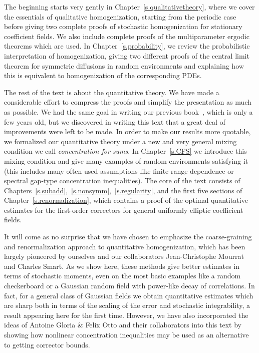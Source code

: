 \documentclass[11pt,twoside]{article} %
\numberwithin{equation}{section}
\theoremstyle{definition}
\begin{document}
 \smallskip
 
The beginning starts very gently in Chapter~\ref{s.qualitativetheory}, where we cover the essentials of qualitative homogenization, starting from the periodic case before giving two complete proofs of stochastic homogenization for stationary coefficient fields. We also include complete proofs of the multiparameter ergodic theorems which are used. 
In Chapter~\ref{s.probability}, we review the probabilistic interpretation of homogenization, giving two different proofs of the central limit theorem for symmetric diffusions in random environments and explaining how this is equivalent to homogenization of the corresponding PDEs. 

\smallskip

The rest of the text is about the quantitative theory. We have made a considerable effort to compress the proofs and simplify the presentation as much as possible. We had the same goal in writing our previous book~\cite{AKMBook}, which is only a few years old, but we discovered in writing this text that a great deal of improvements were left to be made. 
In order to make our results more quotable, we formalized our quantitative theory under a new and very general mixing condition we call \emph{concentration for sums}. In Chapter~\ref{s.CFS} we introduce this mixing condition and give many examples of random environments satisfying it (this includes many often-used assumptions like finite range dependence or spectral gap-type concentration inequalities). 
The core of the text consists of Chapters~\ref{s.subadd},~\ref{s.nonsymm},~\ref{s.regularity}, and the first five sections of Chapter~\ref{s.renormalization}, which contains a proof of the optimal quantitative estimates for the first-order correctors for general uniformly elliptic coefficient fields. 

\smallskip

It will come as no surprise that we have chosen to emphasize the coarse-graining and renormalization approach to quantitative homogenization, which has been largely pioneered by ourselves and our collaborators Jean-Christophe Mourrat and Charles Smart. As we show here, these methods give better estimates in terms of stochastic moments, even on the most basic examples like a random checkerboard or a Gaussian random field with power-like decay of correlations. In fact, for a general class of Gaussian fields we obtain quantitative estimates which are sharp both in terms of the scaling of the error and stochastic integrability, a result appearing here for the first time. However, we have also incorporated the ideas of Antoine Gloria \& Felix Otto and their collaborators into this text by showing how nonlinear concentration inequalities may be used as an alternative to getting corrector bounds. 
\end{document}
